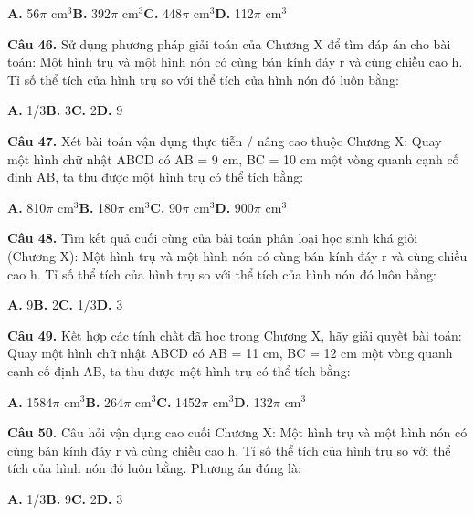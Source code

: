 \documentclass[11pt,a4paper]{article}
\begin{document}
\hspace*{1.5em}\textbf{A.} 56$\pi$ cm$^3$\quad\quad \textbf{B.} 392$\pi$ cm$^3$\quad\quad \textbf{C.} 448$\pi$ cm$^3$\quad\quad \textbf{D.} 112$\pi$ cm$^3$\par\vspace{2pt}
\textbf{\color{primary} Câu 46.} Sử dụng phương pháp giải toán của Chương X để tìm đáp án cho bài toán: Một hình trụ và một hình nón có cùng bán kính đáy r và cùng chiều cao h. Tỉ số thể tích của hình trụ so với thể tích của hình nón đó luôn bằng:\par
\hspace*{1.5em}\textbf{A.} 1/3\quad\quad \textbf{B.} 3\quad\quad \textbf{C.} 2\quad\quad \textbf{D.} 9\par\vspace{2pt}
\textbf{\color{primary} Câu 47.} Xét bài toán vận dụng thực tiễn / nâng cao thuộc Chương X: Quay một hình chữ nhật ABCD có AB = 9 cm, BC = 10 cm một vòng quanh cạnh cố định AB, ta thu được một hình trụ có thể tích bằng:\par
\hspace*{1.5em}\textbf{A.} 810$\pi$ cm$^3$\quad\quad \textbf{B.} 180$\pi$ cm$^3$\quad\quad \textbf{C.} 90$\pi$ cm$^3$\quad\quad \textbf{D.} 900$\pi$ cm$^3$\par\vspace{2pt}
\textbf{\color{primary} Câu 48.} Tìm kết quả cuối cùng của bài toán phân loại học sinh khá giỏi (Chương X): Một hình trụ và một hình nón có cùng bán kính đáy r và cùng chiều cao h. Tỉ số thể tích của hình trụ so với thể tích của hình nón đó luôn bằng:\par
\hspace*{1.5em}\textbf{A.} 9\quad\quad \textbf{B.} 2\quad\quad \textbf{C.} 1/3\quad\quad \textbf{D.} 3\par\vspace{2pt}
\textbf{\color{primary} Câu 49.} Kết hợp các tính chất đã học trong Chương X, hãy giải quyết bài toán: Quay một hình chữ nhật ABCD có AB = 11 cm, BC = 12 cm một vòng quanh cạnh cố định AB, ta thu được một hình trụ có thể tích bằng:\par
\hspace*{1.5em}\textbf{A.} 1584$\pi$ cm$^3$\quad\quad \textbf{B.} 264$\pi$ cm$^3$\quad\quad \textbf{C.} 1452$\pi$ cm$^3$\quad\quad \textbf{D.} 132$\pi$ cm$^3$\par\vspace{2pt}
\textbf{\color{primary} Câu 50.} Câu hỏi vận dụng cao cuối Chương X: Một hình trụ và một hình nón có cùng bán kính đáy r và cùng chiều cao h. Tỉ số thể tích của hình trụ so với thể tích của hình nón đó luôn bằng. Phương án đúng là:\par
\hspace*{1.5em}\textbf{A.} 1/3\quad\quad \textbf{B.} 9\quad\quad \textbf{C.} 2\quad\quad \textbf{D.} 3\par\vspace{2pt}
\end{document}
